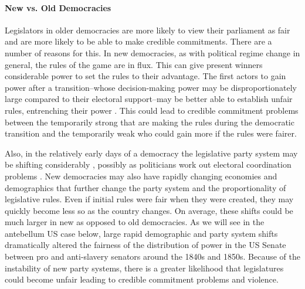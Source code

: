 \documentclass[a4paper]{article}\usepackage[]{graphicx}\usepackage[]{color}
\begin{document}
\paragraph{New vs. Old Democracies}

Legislators in older democracies are more likely to view their parliament as fair and are more likely to be able to make credible commitments. There are a number of reasons for this. In new democracies, as with political regime change in general, the rules of the game are in flux. This can give present winners considerable power to set the rules to their advantage. The first actors to gain power after a transition--whose decision-making power may be disproportionately large compared to their electoral support--may be better able to establish unfair rules, entrenching their power \cite[108]{Saideman2002}. This could lead to credible commitment problems between the temporarily strong that are making the rules during the democratic transition and the temporarily weak who could gain more if the rules were fairer. 

Also, in the relatively early days of a democracy the legislative party system may be shifting considerably \cite[see][161 for a review]{Mainwaring2007b}, possibly as politicians work out electoral coordination problems \citep[e.g.][]{cox1997}. New democracies may also have rapidly changing economies and demographics that further change the party system and the proportionality of legislative rules. Even if initial rules were fair when they were created, they may quickly become less so as the country changes. On average, these shifts could be much larger in new as opposed to old democracies. As we will see in the antebellum US case below, large rapid demographic and party system shifts dramatically altered the fairness of the distribution of power in the US Senate between pro and anti-slavery senators around the 1840s and 1850s. Because of the instability of new party systems, there is a greater likelihood that legislatures could become unfair leading to credible commitment problems and violence.
\end{document}
